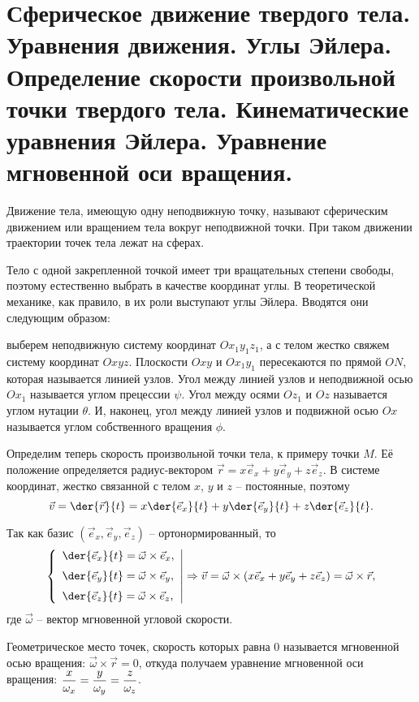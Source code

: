 \chapter{Сферическое движение твердого тела. Уравнения движения. Углы Эйлера.
Определение скорости произвольной точки твердого тела. Кинематические
уравнения Эйлера. Уравнение мгновенной оси вращения.}

Движение тела, имеющую одну неподвижную точку, называют сферическим движением
или вращением тела вокруг неподвижной точки. При таком движении траектории точек
тела лежат на сферах.

Тело с одной закрепленной точкой имеет три вращательных степени свободы, поэтому
естественно выбрать в качестве координат углы. В теоретической механике, как
правило, в их роли выступают углы Эйлера. Вводятся они следующим образом:

выберем неподвижную систему координат \( Ox_1y_1z_1 \), а с телом жестко свяжем
систему координат \( Oxyz \). Плоскости \( Oxy \) и \( Ox_1y_1 \) пересекаются
по прямой \( ON \), которая называется линией узлов. Угол между линией узлов и
неподвижной осью \( Ox_1 \) называется углом прецессии \( \psi \). Угол между
осями \( Oz_1 \) и \( Oz \) называется углом нутации \( \theta \). И, наконец,
угол между линией узлов и подвижной осью \( Ox \) называется углом собственного
вращения \( \phi \).

Определим теперь скорость произвольной точки тела, к примеру точки \( M \). Её
положение определяется радиус-вектором \( \vec{r} = x\vec{e}_x + y\vec{e}_y +
z\vec{e}_z \). В системе координат, жестко связанной с телом \( x \), \( y \) и
\( z \) -- постоянные, поэтому
\[
    \vec{v} = \der{\vec{r}}{t} = x\der{\vec{e}_x}{t} + y\der{\vec{e}_y}{t} +
    z\der{\vec{e}_z}{t}.
\]

Так как базис \( (\vec{e}_x, \vec{e}_y, \vec{e}_z) \) -- ортонормированный, то
\[
    \left\{ \begin{array}{l}
        \ds\der{\vec{e}_x}{t} = \vec{\omega}\times\vec{e}_x, \\[.6em]
        \ds\der{\vec{e}_y}{t} = \vec{\omega}\times\vec{e}_y, \\[.6em]
        \ds\der{\vec{e}_z}{t} = \vec{\omega}\times\vec{e}_z,
    \end{array} \right| \Rightarrow
    \vec{v} = \vec{\omega}\times(x\vec{e}_x + y\vec{e}_y + z\vec{e}_z) =
    \vec{\omega}\times\vec{r},
\]
где \( \vec{\omega} \) -- вектор мгновенной угловой скорости.

Геометрическое место точек, скорость которых равна 0 называется мгновенной осью
вращения: \( \vec{\omega}\times\vec{r} = 0 \), откуда получаем уравнение
мгновенной оси вращения: \( \displaystyle \frac{x}{\omega_x} = \frac{y}{\omega_y} =
\frac{z}{\omega_z} \).

